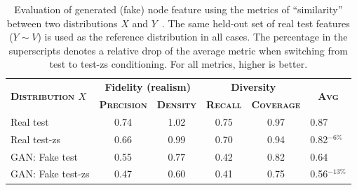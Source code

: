 \begin{table}[t]
	\centering
	\caption{\small Evaluation of generated (fake) node feature using the metrics of ``similarity'' between two distributions $X$ and $Y$~\citep{kynkaanniemi2019improved,naeem2020reliable}. The same held-out set of real test features ($Y \sim V$) is used as the reference distribution in all cases. The percentage in the superscripts denotes a relative drop of the average metric when switching from test to test-zs conditioning. For all metrics, higher is better.}
	\label{tab:gen}
	\vspace{-5pt}
	\scriptsize
	\setlength{\tabcolsep}{5pt}
	\begin{tabular}{l|cc|cc|p{1.2cm}}
	\toprule
		\multirow{2}{*}{\tiny\bf\textsc{Distribution $X$}} & \multicolumn{2}{c|}{\bf Fidelity (realism)} & \multicolumn{2}{c|}{\bf Diversity} & \multicolumn{1}{c}{\multirow{2}{*}{\bf \textsc{Avg}}}\Tstrut\\
		& \bf \textsc{Precision} & \bf \textsc{Density} 
		& \bf \textsc{Recall} & \bf \textsc{Coverage} & \Bstrut\\
		\midrule
		Real test  & 0.74 & 1.02 & 0.75 & 0.97 & 0.87 \Tstrut\\
		Real test-zs & 0.66 & 0.99 & 0.70 & 0.94 & 0.82$^{-6\%}$ \\
		GAN: Fake test & 0.55 & 0.77 & 0.42 & 0.82 & 0.64 \\
		GAN: Fake test-zs & 0.47 & 0.60 & 0.41 & 0.75 & 0.56$^{-13\%}$\\
	    \bottomrule
    \end{tabular}
\end{table}

